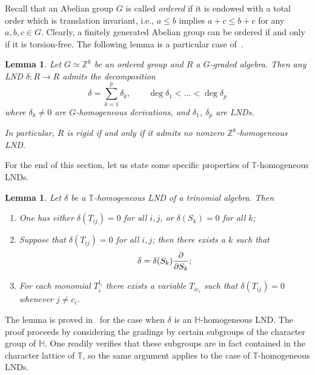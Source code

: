 \documentclass[a4paper,reqno,12pt]{amsart}
\theoremstyle{plain}
\theoremstyle{definition}
\newtheorem{definition}[theorem]{Definition}
\theoremstyle{plain}
\newtheorem{lemma}[theorem]{Lemma}
\theoremstyle{remark}
\newcommand{\TT}{\mathbb{T}}
\newcommand{\ZZ}{\mathbb Z}
\newcommand{\HH}{\mathbb H}
\begin{document}
Recall that an Abelian group $G$ is called \emph{ordered} if it is endowed with a total order which is translation invariant, i.e., $a\le b$ implies $a+c\le b+c$ for any $a,b,c\in G$. Clearly, a finitely generated Abelian group can be ordered if and only if it is torsion-free. The following lemma is a particular case of~\cite[Lemma~1.10]{Liendo}.
\begin{lemma}\label{LemmaLNDHomDecomposition}
    Let $G\simeq\ZZ^k$ be an ordered group and $R$ a $G$-graded algebra. Then any LND $\delta\colon R\to R$ admits the decomposition
    $$
    \delta=\sum_{k=1}^p\delta_k, \qquad\deg\delta_1<\ldots<\deg\delta_p
    $$
     where $\delta_k\neq0$ are $G$-homogeneous derivations, and $\delta_1$, $\delta_p$ are LNDs.

    In particular, $R$ is rigid if and only if it admits no nonzero $\mathbb Z^k$-homogeneous LND.
\end{lemma}
For the end of this section, let us state some specific properties of ${\TT}$-homogeneous LNDs. 
\begin{lemma}\label{LemmaHLND}
    Let $\delta$ be a $\mathbb T$-homogeneous LND of a trinomial algebra. Then
    \begin{enumerate}
        \item [$(i)$] One has either $\delta(T_{ij})=0$ for all $i,j$, or $\delta(S_k)=0$ for all $k$;
        \item [$(ii)$] Suppose that $\delta(T_{ij})=0$ for all $i,j$; then there exists a $k$ such that $$\delta = \delta(S_{k}){\partial\over\partial S_{k}};$$
        \item[$(iii)$] For each monomial $T_i^{l_i}$ there exists a variable $T_{ic_i}$ such that $\delta(T_{ij})=0$ whenever $j\neq c_i$.
    \end{enumerate}
\end{lemma}
The lemma is proved in~\cite[Lemmas~6, 7, 8]{R} for the case when $\delta$ is an $\HH$-homogeneous LND. The proof proceeds by considering the gradings by certain subgroups of the character group of $\HH$. One readily verifies that these subgroups are in fact contained in the character lattice of ${\TT}$, so the same argument applies to the case of ${\TT}$-homogeneous LNDs.
\end{document}
